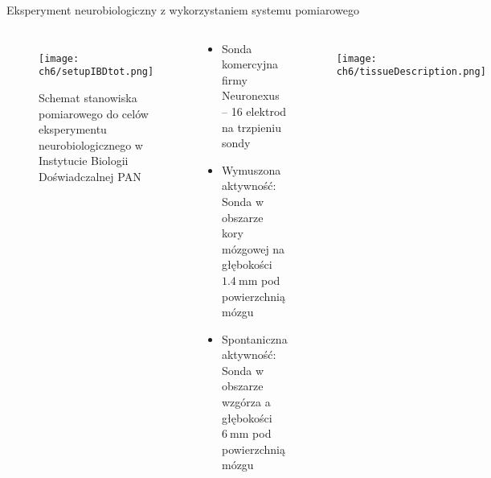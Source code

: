 \begin{frame}{Eksperyment neurobiologiczny z wykorzystaniem systemu pomiarowego}
    \begin{columns}

        \begin{figure}[H]
            \centering 
            \texttt{[image: ch6/setupIBDtot.png]}  
            \caption{Schemat stanowiska pomiarowego do celów eksperymentu neurobiologicznego w Instytucie Biologii Doświadczalnej PAN}
        \end{figure}

        \vspace{-1em}

        \begin{block}{}
            \begin{itemize}
                \item Sonda komercyjna firmy Neuronexus -- 16 elektrod na trzpieniu sondy
                \item Wymuszona aktywność: Sonda w obszarze kory mózgowej na głębokości $\SI{1.4}{\milli\metre}$ pod powierzchnią mózgu
                \item Spontaniczna aktywność: Sonda w obszarze wzgórza a głębokości $\SI{6}{\milli\metre}$ pod powierzchnią mózgu
            \end{itemize}
        \end{block}
        \vspace{-1em}

        \begin{figure}[H]
            \centering 
            \texttt{[image: ch6/tissueDescription.png]}  
        \end{figure}
    \end{columns}

\end{frame}

   
   

